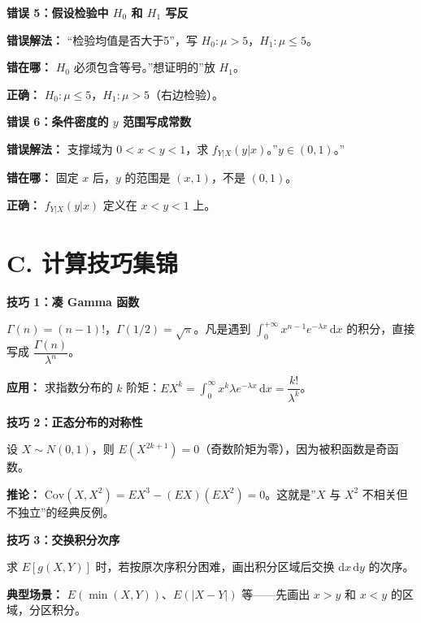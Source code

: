 ﻿\documentclass[lang=cn,11pt]{elegantbook}
\begin{document}
\begin{note}
\textbf{错误 5：假设检验中 $H_0$ 和 $H_1$ 写反}

\textbf{错误解法：} “检验均值是否大于5”，写 $H_0\colon\mu>5$，$H_1\colon\mu\leq 5$。

\textbf{错在哪：} $H_0$ 必须包含等号。”想证明的”放 $H_1$。

\textbf{正确：} $H_0\colon\mu\leq 5$，$H_1\colon\mu>5$（右边检验）。
\end{note}

\begin{note}
\textbf{错误 6：条件密度的 $y$ 范围写成常数}

\textbf{错误解法：} 支撑域为 $0<x<y<1$，求 $f_{Y|X}(y|x)$。”$y\in(0,1)$。”

\textbf{错在哪：} 固定 $x$ 后，$y$ 的范围是 $(x,1)$，不是 $(0,1)$。

\textbf{正确：} $f_{Y|X}(y|x)$ 定义在 $x<y<1$ 上。
\end{note}

\section*{C. 计算技巧集锦}

\begin{note}
\textbf{技巧 1：凑 Gamma 函数}

$\Gamma(n)=(n-1)!$，$\Gamma(1/2)=\sqrt\pi$。凡是遇到 $\int_0^{+\infty}x^{n-1}e^{-\lambda x}\,\mathrm{d}x$ 的积分，直接写成 $\dfrac{\Gamma(n)}{\lambda^n}$。

\textbf{应用：} 求指数分布的 $k$ 阶矩：$EX^k=\int_0^\infty x^k\lambda e^{-\lambda x}\,\mathrm{d}x=\dfrac{k!}{\lambda^k}$。
\end{note}

\begin{note}
\textbf{技巧 2：正态分布的对称性}

设 $X\sim N(0,1)$，则 $E(X^{2k+1})=0$（奇数阶矩为零），因为被积函数是奇函数。

\textbf{推论：} $\mathrm{Cov}(X,X^2)=EX^3-(EX)(EX^2)=0$。这就是”$X$ 与 $X^2$ 不相关但不独立”的经典反例。
\end{note}

\begin{note}
\textbf{技巧 3：交换积分次序}

求 $E[g(X,Y)]$ 时，若按原次序积分困难，画出积分区域后交换 $\mathrm{d}x\,\mathrm{d}y$ 的次序。

\textbf{典型场景：} $E(\min(X,Y))$、$E(|X-Y|)$ 等——先画出 $x>y$ 和 $x<y$ 的区域，分区积分。
\end{note}
\end{document}
